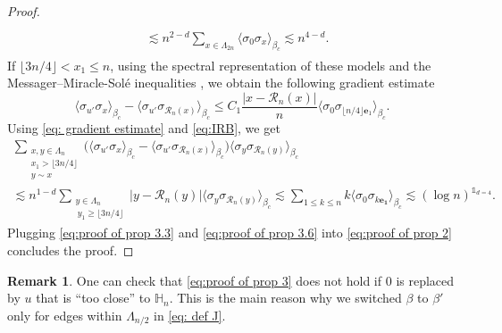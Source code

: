 \documentclass[11pt,a4paper]{article}
\numberwithin{equation}{section}
\theoremstyle{plain}
\theoremstyle{definition}
\newtheorem{Rem}[Thm]{Remark}
\begin{document}
\begin{proof}
\begin{align}
\begin{aligned}
    \\
    &\lesssim 
    n^{2-d}\sum_{x\in \Lambda_{2n}}\langle \sigma_0\sigma_x\rangle_{\beta_c}\lesssim n^{4-d}.
      \end{aligned}
 \end{align}
If $\lfloor 3n/4\rfloor <x_1\leq n$, using the spectral representation of these models and the Messager--Miracle-Sol\'e inequalities \cite{MessagerMiracleSoleInequalityIsing}, we obtain the following gradient estimate
\begin{equation}\label{eq: gradient estimate}
    \langle \sigma_{u'}\sigma_x\rangle_{\beta_c}-\langle \sigma_{u'}\sigma_{\mathcal{R}_n(x)}\rangle_{\beta_c}
    \leq 
    C_1\frac{|x-\mathcal{R}_n(x)|}{n}\langle \sigma_0\sigma_{\lfloor n/4\rfloor \mathbf{e}_1}\rangle_{\beta_c}.
\end{equation}
Using \eqref{eq: gradient estimate} and \eqref{eq:IRB}, we get
\begin{multline}\label{eq:proof of prop 3.6}
    \sum_{\substack{x,y\in \Lambda_n\\ x_1> \lfloor 3n/4\rfloor \\y\sim x}}\Big(\langle \sigma_{u'}\sigma_x\rangle_{\beta_c}-\langle \sigma_{u'}\sigma_{\mathcal{R}_n(x)}\rangle_{\beta_c}\Big)\langle \sigma_y\sigma_{\mathcal{R}_n(y)}\rangle_{\beta_c}
    \\\lesssim n^{1-d}\sum_{\substack{y\in \Lambda_n\\ \:y_1\geq \lfloor 3n/4\rfloor }}|y-\mathcal R_n(y)|\langle \sigma_y\sigma_{\mathcal R_n(y)}\rangle_{\beta_c}
    \lesssim \sum_{1\leq k\leq n}k\langle \sigma_0\sigma_{k\mathbf{e_1}}\rangle_{\beta_c}\lesssim (\log n)^{\mathds{1}_{d=4}}.
    \end{multline}
Plugging \eqref{eq:proof of prop 3.3} and \eqref{eq:proof of prop 3.6} into \eqref{eq:proof of prop 2} concludes the proof.
		\end{proof}
\begin{Rem} One can check that \eqref{eq:proof of prop 3} does not hold if $0$ is replaced by $u$ that is ``too close'' to $\mathbb H_n$. This is the main reason why we switched $\beta$ to $\beta'$ only for edges within $\Lambda_{n/2}$ in \eqref{eq: def J}.
\end{Rem}
\end{document}
